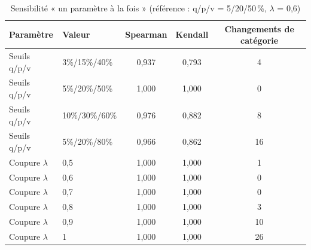 \begin{table}[htbp]
\centering
\footnotesize\setlength{\tabcolsep}{4pt}
\caption{Sensibilité « un paramètre à la fois » (référence : q/p/v = 5/20/50\,\%, $\lambda$ = 0,6)}\label{tab:sensibilite}
\begin{tabular}{llccc}
\toprule
Paramètre & Valeur & Spearman & Kendall & Changements de catégorie \\
\midrule
Seuils q/p/v & 3\%/15\%/40\% & 0,937 & 0,793 & 4 \\
Seuils q/p/v & 5\%/20\%/50\% & 1,000 & 1,000 & 0 \\
Seuils q/p/v & 10\%/30\%/60\% & 0,976 & 0,882 & 8 \\
Seuils q/p/v & 5\%/20\%/80\% & 0,966 & 0,862 & 16 \\
Coupure $\lambda$ & 0,5 & 1,000 & 1,000 & 1 \\
Coupure $\lambda$ & 0,6 & 1,000 & 1,000 & 0 \\
Coupure $\lambda$ & 0,7 & 1,000 & 1,000 & 0 \\
Coupure $\lambda$ & 0,8 & 1,000 & 1,000 & 3 \\
Coupure $\lambda$ & 0,9 & 1,000 & 1,000 & 10 \\
Coupure $\lambda$ & 1 & 1,000 & 1,000 & 26 \\
\bottomrule
\end{tabular}
\end{table}
